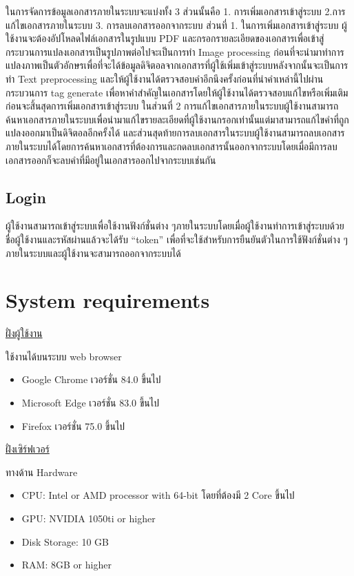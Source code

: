 ในการจัดการข้อมูลเอกสารภายในระบบจะแบ่งทั้ง 3 ส่วนนั้นคือ 1. การเพิ่มเอกสารเข้าสู่ระบบ 2.การแก้ไขเอกสารภายในระบบ  3. การลบเอกสารออกจากระบบ 
ส่วนที่ 1. ในการเพิ่มเอกสารเข้าสู่ระบบ ผู้ใช้งานจะต้องอัปโหลดไฟล์เอกสารในรูปแบบ PDF และกรอกรายละเอียดของเอกสารเพื่อเข้าสู่กระบวนการแปลงเอกสารเป็นรูปภาพต่อไปจะเป็นการทำ Image processing ก่อนที่จะนำมาทำการแปลงภาพเป็นตัวอักษรเพื่อที่จะได้ข้อมูลดิจิตอลจากเอกสารที่ผู้ใช้เพิ่มเข้าสู่ระบบหลังจากนั้นจะเป็นการทำ Text preprocessing และให้ผู้ใช้งานได้ตรวจสอบคำอีกนึงครั้งก่อนที่นำคำเหล่านี้ไปผ่านกระบวนการ tag generate เพื่อหาคำสำคัญในเอกสารโดยให้ผู้ใช้งานได้ตรวจสอบแก้ไขหรือเพิ่มเติมก่อนจะสิ้นสุดการเพิ่มเอกสารเข้าสู่ระบบ ในส่วนที่ 2 การแก้ไขเอกสารภายในระบบผู้ใช้งานสามารถค้นหาเอกสารภายในระบบเพื่อนำมาแก้ไขรายละเอียดที่ผู้ใช้งานกรอกเท่านั้นแต่มาสามารถแก้ไขคำที่ถูกแปลงออกมาเป็นดิจิตอลอีกครั้งได้ และส่วนสุดท้ายการลบเอกสารในระบบผู้ใช้งานสามารถลบเอกสารภายในระบบได้โดยการค้นหาเอกสารที่ต้องการและกดลบเอกสารนั้นออกจากระบบโดยเมื่อมีการลบเอกสารออกก็จะลบคำที่มีอยู่ในเอกสารออกไปจากระบบเช่นกัน

\subsection{Login}

ผู้ใช้งานสามารถเข้าสู่ระบบเพื่อใช้งานฟังก์ชั่นต่าง ๆภายในระบบโดยเมื่อผู้ใช้งานทำการเข้าสู่ระบบด้วยชื่อผู้ใช้งานและรหัสผ่านแล้วจะได้รับ “token” เพื่อที่จะใช้สำหรับการยืนยันตัวในการใช้ฟังก์ชั่นต่าง ๆภายในระบบและผู้ใช้งานจะสามารถออกจากระบบได้

\section{System requirements}

\underline{ฝั่งผู้ใช้งาน}

ใช้งานได้บนระบบ web browser 

\begin{itemize}
    \item Google Chrome เวอร์ชั่น 84.0 ขึ้นไป 
    \item Microsoft Edge เวอร์ชั่น 83.0 ขึ้นไป
    \item Firefox เวอร์ชั่น 75.0 ขึ้นไป
\end{itemize}
 
\underline{ฝั่งเซิร์ฟเวอร์}
		
ทางด้าน Hardware

        \begin{itemize}
            \item CPU: Intel or AMD processor with 64-bit โดยที่ต้องมี 2 Core ขึ้นไป
            \item GPU: NVIDIA 1050ti or higher
            \item Disk Storage: 10 GB
            \item RAM: 8GB or higher
        \end{itemize}
        
